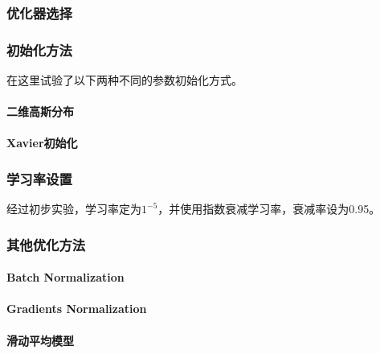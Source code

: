 \subsubsection{优化器选择}

\subsubsection{初始化方法}
在这里试验了以下两种不同的参数初始化方式。
\paragraph{二维高斯分布}
\paragraph{Xavier初始化}
\subsubsection{学习率设置}
经过初步实验，学习率定为$1^{-5}$，并使用指数衰减学习率，衰减率设为0.95。
\subsubsection{其他优化方法}
\paragraph{Batch Normalization}
\paragraph{Gradients Normalization}
\paragraph{滑动平均模型}
